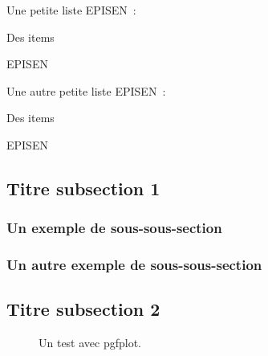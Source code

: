 \noindent Une petite liste EPISEN~:
\begin{itemizeRondEPISEN}
\item Des items
\item EPISEN
\end{itemizeRondEPISEN}

\noindent Une autre petite liste EPISEN~:
\begin{enumerateEPISEN}
\item Des items
\item EPISEN
\end{enumerateEPISEN}

\lipsum[7]

\subsection{Titre subsection 1}

\lipsum[14]

\lipsum[11]

\subsubsection{Un exemple de sous-sous-section}

\lipsum[15]

\lipsum[18]

\subsubsection{Un autre exemple de sous-sous-section}

\lipsum[19]

\lipsum[20]


\subsection{Titre subsection 2}

\lipsum[16]

\lipsum[17]

\begin{figure}[!t]
\begin{center}
\end{center}
\caption{Un test avec pgfplot.}
\label{fig:test1}
\end{figure}


